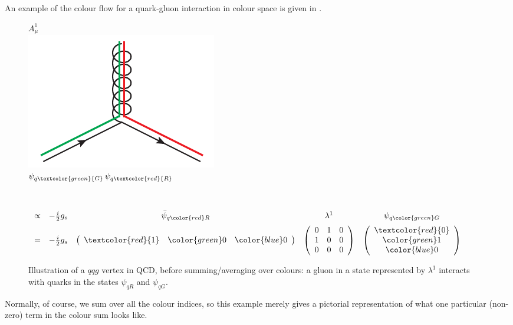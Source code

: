 An example of the colour flow for a
quark-gluon interaction in colour 
space is given in .
\begin{figure}[t]
\begin{center}
\begin{minipage}[h]{4.6cm}
\begin{center}
$A^1_\mu$\\
\includegraphics*[scale=0.75]{qgv.pdf}\\[-3mm]
$\psi_{q\textcolor{green}{G}}$\hfill$\psi_{q\textcolor{red}{R}}$
\end{center}
\end{minipage}~~~
\parbox{0.4\textwidth}{
$
\begin{array}{ccccc}
\propto & - \frac{i}{2} g_s & \bar{\psi}_{q\color{red}R}  & \lambda^{1} & \psi_{q\color{green}G} 
\\[2mm]
= & -\frac{i}{2}g_s & \left(\begin{array}{ccc} \textcolor{red}{1} & \color{green} 0 &
  \color{blue} 0 
\end{array}\right) & 
\left(\begin{array}{ccc}
0 & 1 & 0  \\
1 & 0 & 0 \\
0 & 0 & 0
\end{array}\right) & 
 \left(\begin{array}{c}
\textcolor{red}{0} \\
\color{green}1 \\
\color{blue}0
\end{array}\right) \end{array}
$}
\caption{Illustration of a 
$qqg$ vertex in QCD, before
  summing/averaging over colours: a gluon in a state represented by $\lambda^1$
  interacts with quarks in the states $\psi_{qR}$ and
  $\psi_{qG}$. \label{fig:qg}}
\end{center}
\end{figure}
Normally, of course, we sum over all the colour indices, so this
example merely gives a pictorial representation of what one particular
(non-zero) term in the colour sum looks like.


